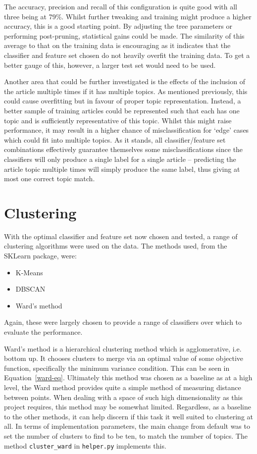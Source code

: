 \documentclass[11pt]{article}
\begin{document}
The accuracy, precision and recall of this configuration is quite good with all three being at 79\%. Whilst further tweaking and training might produce a higher accuracy, this is a good starting point. By adjusting the tree parameters or performing post-pruning, statistical gains could be made. The similarity of this average to that on the training data is encouraging as it indicates that the classifier and feature set chosen do not heavily overfit the training data. To get a better gauge of this, however, a larger test set would need to be used.

Another area that could be further investigated is the effects of the inclusion of the article multiple times if it has multiple topics. As mentioned previously, this could cause overfitting but in favour of proper topic representation. Instead, a better sample of training articles could be represented such that each has one topic and is sufficiently representative of this topic. Whilst this might raise performance, it may result in a higher chance of misclassification for ‘edge’ cases which could fit into multiple topics. As it stands, all classifier/feature set combinations effectively guarantee themselves some misclassifications since the classifiers will only produce a single label for a single article – predicting the article topic multiple times will simply produce the same label, thus giving at most one correct topic match.

\section{Clustering}
With the optimal classifier and feature set now chosen and tested, a range of clustering algorithms were used on the data. The methods used, from the SKLearn package, were:
\begin{itemize}
\item K-Means~\cite{kmeans}
\item DBSCAN~\cite{dbscan}
\item Ward's method~\cite{wards-meth}
\end{itemize}
Again, these were largely chosen to provide a range of classifiers over which to evaluate the performance. 

Ward's method is a hierarchical clustering method which is agglomerative, i.e. bottom up. It chooses clusters to merge via an optimal value of some objective function, specifically the minimum variance condition. This can be seen in Equation~\ref{ward-eq}. Ultimately this method was chosen as a baseline as at a high level, the Ward method provides quite a simple method of measuring distance between points. When dealing with a space of such high dimensionality as this project requires, this method may be somewhat limited. Regardless, as a baseline to the other methods, it can help discern if this task it well suited to clustering at all. In terms of implementation parameters, the main change from default was to set the number of clusters to find to be ten, to match the number of topics. The method \texttt{cluster\_ward} in \texttt{helper.py} implements this.
\end{document}
